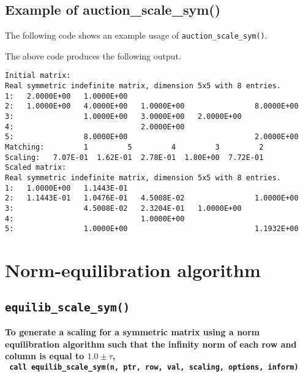 \subsection{Example of auction\_scale\_sym()}
The following code shows an example usage of \texttt{auction\_scale\_sym()}.

The above code produces the following output.
\begin{verbatim}
Initial matrix:
Real symmetric indefinite matrix, dimension 5x5 with 8 entries.
1:   2.0000E+00   1.0000E+00                                       
2:   1.0000E+00   4.0000E+00   1.0000E+00                8.0000E+00
3:                1.0000E+00   3.0000E+00   2.0000E+00             
4:                             2.0000E+00                          
5:                8.0000E+00                             2.0000E+00
Matching:         1         5         4         3         2
Scaling:   7.07E-01  1.62E-01  2.78E-01  1.80E+00  7.72E-01
Scaled matrix:
Real symmetric indefinite matrix, dimension 5x5 with 8 entries.
1:   1.0000E+00   1.1443E-01                                       
2:   1.1443E-01   1.0476E-01   4.5008E-02                1.0000E+00
3:                4.5008E-02   2.3204E-01   1.0000E+00             
4:                             1.0000E+00                          
5:                1.0000E+00                             1.1932E+00
\end{verbatim}


\section{Norm-equilibration algorithm}

\subsection{\texttt{equilib\_scale\_sym()}}

\textbf{\noindent
   To generate a scaling for a symmetric matrix using a norm equilibration algorithm such that the infinity norm of each row and column is equal to $1.0\pm\tau$,
   \vspace*{0.3cm} \\
   \texttt{ \hspace*{0.2cm}
      call equilib\_scale\_sym(n, ptr, row, val, scaling, options, inform)
   }
   \vspace{0.3cm}
}

